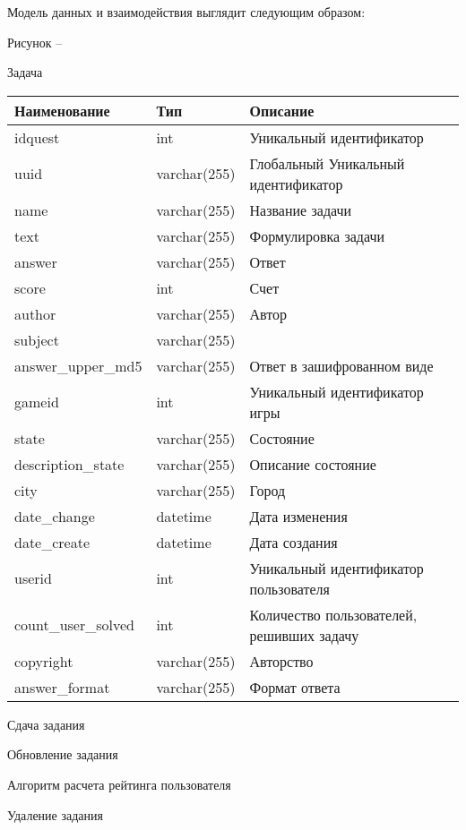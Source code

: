 Модель данных и взаимодействия выглядит следующим образом:
\begin{center}

Рисунок --  \\
\end{center}
\vspace{\baselineskip}

\begin{center}
Задача
\end{center}

\begin{tabular}{l@{\hspace{5mm}}l@{\hspace{5mm}}l@{\hspace{5mm}}l} 
\toprule
Наименование & Тип  & Описание\\
\midrule
  idquest & int & Уникальный идентификатор\\
  uuid & varchar(255) & Глобальный Уникальный идентификатор\\
  name & varchar(255) & Название задачи\\
  text & varchar(255) & Формулировка задачи\\
  answer & varchar(255) & Ответ\\
  score & int & Счет\\
  author & varchar(255) & Автор\\
  subject & varchar(255) & \\
  answer\_upper\_md5 & varchar(255) & Ответ в зашифрованном виде\\
  gameid & int & Уникальный идентификатор игры\\
  state & varchar(255) & Состояние\\
  description\_state & varchar(255) & Описание состояние\\
  city & varchar(255) & Город\\
  date\_change & datetime & Дата изменения\\
  date\_create & datetime & Дата создания\\
  userid & int & Уникальный идентификатор пользователя\\
  count\_user\_solved & int & Количество пользователей, решивших задачу\\
  copyright & varchar(255) & Авторство\\
  answer\_format & varchar(255) & Формат ответа\\
\bottomrule
\end{tabular}
\vspace{\baselineskip}

\begin{center}
Сдача задания
\end{center}

\begin{center}
Обновление задания
\end{center}
Алгоритм расчета рейтинга пользователя

\begin{center}
Удаление задания
\end{center}

